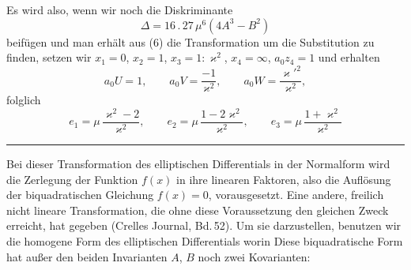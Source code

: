 
Es wird also, wenn wir noch die Diskriminante
\[
\Delta = 16\,.\,27\,\mu^6(4A^3 - B^2)
\]
beifügen
und man erhält aus (6) die Transformation
um die Substitution zu finden, setzen wir $x_1=0$, $x_2=1$, $x_3=1{:}\varkappa^2$, $x_4=\infty$,
$a_0z_4=1$ und erhalten
\[
a_0U = 1, \qquad a_0V = \frac{-1}{\varkappa^2}, \qquad a_0W = \frac{\varkappa'^2}{\varkappa^2},
\]
folglich
\[
e_1 = \mu\,\frac{\varkappa^2-2}{\varkappa^2}, \qquad e_2 = \mu\,\frac{1-2\varkappa^2}{\varkappa^2}, \qquad e_3 = \mu\,\frac{1+\varkappa^2}{\varkappa^2}
\]

\begin{center}\rule{3cm}{0.4pt}\end{center}

Bei dieser Transformation des elliptischen Differentials in der  Normalform wird die Zerlegung der Funktion $f(x)$ in ihre linearen Faktoren, also die Auflösung der biquadratischen Gleichung $f(x)=0$, vorausgesetzt. Eine andere, freilich nicht lineare Transformation, die ohne diese Voraussetzung den gleichen Zweck erreicht, hat  gegeben (Crelles Journal, Bd.\,52). Um sie darzustellen, benutzen wir die homogene Form des elliptischen Differentials
worin
Diese biquadratische Form hat außer den beiden Invarianten $A$, $B$ noch zwei Kovarianten:
